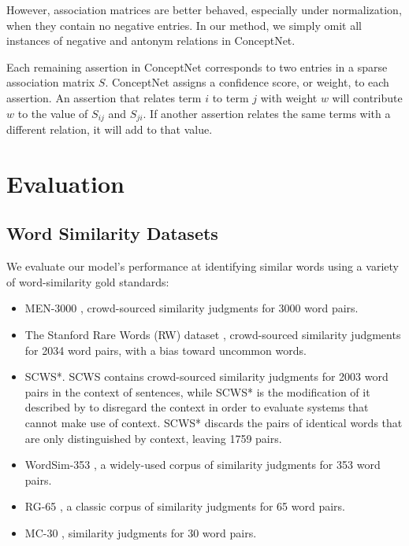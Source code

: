 \documentclass[letterpaper]{article}
\begin{document}
However, association matrices are better behaved, especially under
normalization, when they contain no negative entries. In our method, we simply
omit all instances of negative and antonym relations in ConceptNet.

Each remaining assertion in ConceptNet corresponds to two entries in a sparse
association matrix $S$. ConceptNet assigns a confidence score, or weight, to each
assertion. An assertion that relates term $i$ to term $j$ with weight $w$ will
contribute $w$ to the value of $S_{ij}$ and $S_{ji}$. If another assertion relates
the same terms with a different relation, it will add to that value.


\section{Evaluation}

\subsection{Word Similarity Datasets}

We evaluate our model's performance at identifying similar words using a
variety of word-similarity gold standards:

\begin{itemize}
\item MEN-3000 \cite{bruni2014men}, crowd-sourced similarity judgments for 3000
    word pairs.
\item The Stanford Rare Words (RW) dataset \cite{luong2013rw}, crowd-sourced
    similarity judgments for 2034 word pairs, with a bias toward uncommon words.
\item SCWS*. SCWS \cite{huang2012scws} contains crowd-sourced similarity
    judgments for 2003 word pairs in the context of sentences, while SCWS* is
    the modification of it described by 
    to disregard the context in order to evaluate
    systems that cannot make use of context. SCWS* discards the pairs of
    identical words that are only distinguished by context, leaving 1759 pairs.
\item WordSim-353 \cite{finkelstein2001ws}, a widely-used corpus of similarity
    judgments for 353 word pairs.
\item RG-65 \cite{rubinstein1965rg}, a classic corpus of similarity judgments
    for 65 word pairs.
\item MC-30 \cite{miller1991mc}, similarity judgments for 30 word pairs.
\end{itemize}
\end{document}
